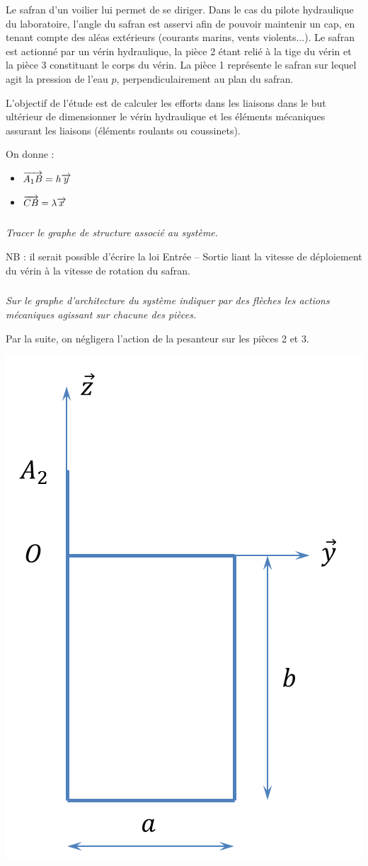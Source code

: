\documentclass[10pt,fleqn]{article} %
\begin{document}
\begin{multicols}{2}
Le safran d'un voilier lui permet de se diriger. Dans le cas du pilote hydraulique du laboratoire, l'angle du safran est asservi afin de pouvoir maintenir un cap, en tenant compte des aléas extérieurs (courants marins, vents violents...). Le safran est actionné par un vérin hydraulique, la pièce 2 étant relié à la tige du vérin et la pièce 3 constituant le corps du vérin. La pièce 1 représente le safran sur lequel agit la pression de l'eau $p$, perpendiculairement au plan du safran. 

L'objectif de l'étude est de calculer les efforts dans les liaisons dans le but ultérieur de dimensionner le vérin hydraulique et les éléments mécaniques assurant les liaisons (éléments roulants ou coussinets). 





On donne : 
\begin{itemize}
\item $\overrightarrow{A_1B}=h\overrightarrow{y}$
\item $\overrightarrow{CB}=\lambda\overrightarrow{x}$
\end{itemize}

\subparagraph{}
\textit{Tracer le graphe de structure associé au système.}

NB : il serait possible d'écrire la loi Entrée -- Sortie liant la vitesse de déploiement du vérin à la vitesse de rotation du safran.

\subparagraph{}
\textit{Sur le graphe d'architecture du système indiquer par des flèches les actions mécaniques agissant sur chacune des pièces.}

Par la suite, on négligera l'action de la pesanteur sur les pièces 2 et 3. 

\begin{center}
{\includegraphics[width=.5\linewidth]{images/safran3}}
\end{center}


\end{multicols}
\end{document}
